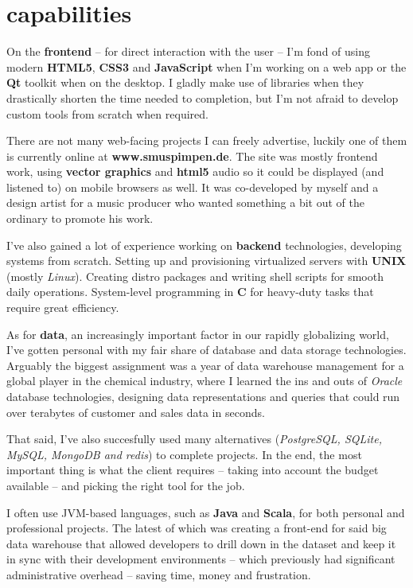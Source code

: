 \documentclass[]{friggeri-cv}
\begin{document}
\section{capabilities}

On the \textbf{frontend} -- for direct interaction with the user -- I'm fond of using modern \textbf{HTML5}, \textbf{CSS3} and \textbf{JavaScript} when I'm working on a web app or the \textbf{Qt} toolkit when on the desktop. I gladly make use of libraries when they drastically shorten the time needed to completion, but I'm not afraid to develop custom tools from scratch when required.

There are not many web-facing projects I can freely advertise, luckily one of them is currently online at \textbf{www.smuspimpen.de}. The site was mostly frontend work, using \textbf{vector graphics} and \textbf{html5} audio so it could be displayed (and listened to) on mobile browsers as well. It was co-developed by myself and a design artist for a music producer who wanted something a bit out of the ordinary to promote his work.

I've also gained a lot of experience working on \textbf{backend} technologies, developing systems from scratch. Setting up and provisioning virtualized servers with \textbf{UNIX} (mostly \emph{Linux}). Creating distro packages and writing shell scripts for smooth daily operations. System-level programming in \textbf{C} for heavy-duty tasks that require great efficiency.

As for \textbf{data}, an increasingly important factor in our rapidly globalizing world, I've gotten personal with my fair share of database and data storage technologies. Arguably the biggest assignment was a year of data warehouse management for a global player in the chemical industry, where I learned the ins and outs of \emph{Oracle} database technologies, designing data representations and queries that could run over terabytes of customer and sales data in seconds.

That said, I've also succesfully used many alternatives (\emph{PostgreSQL, SQLite, MySQL, MongoDB and redis}) to complete projects. In the end, the most important thing is what the client requires -- taking into account the budget available -- and picking the right tool for the job.

I often use JVM-based languages, such as \textbf{Java} and \textbf{Scala}, for both personal and professional projects. The latest of which was creating a front-end for said big data warehouse that allowed developers to drill down in the dataset and keep it in sync with their development environments -- which previously had significant administrative overhead -- saving time, money and frustration.
\end{document}
